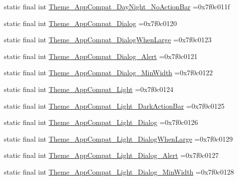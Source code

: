 \begin{DoxyCompactItemize}
\item 
static final int \mbox{\hyperlink{classbr_1_1unb_1_1cic_1_1mp_1_1marketmaster_1_1test_1_1R_1_1style_ac6993f6ab20ad18c1a265c58568cda1f}{Theme\+\_\+\+App\+Compat\+\_\+\+Day\+Night\+\_\+\+No\+Action\+Bar}} =0x7f0c011f
\item 
static final int \mbox{\hyperlink{classbr_1_1unb_1_1cic_1_1mp_1_1marketmaster_1_1test_1_1R_1_1style_a271f53b900eb4d5d0e50e66018ad697e}{Theme\+\_\+\+App\+Compat\+\_\+\+Dialog}} =0x7f0c0120
\item 
static final int \mbox{\hyperlink{classbr_1_1unb_1_1cic_1_1mp_1_1marketmaster_1_1test_1_1R_1_1style_a4bf259a83106d9bae3563b689e81ff97}{Theme\+\_\+\+App\+Compat\+\_\+\+Dialog\+When\+Large}} =0x7f0c0123
\item 
static final int \mbox{\hyperlink{classbr_1_1unb_1_1cic_1_1mp_1_1marketmaster_1_1test_1_1R_1_1style_aeb0354574072f32c3c8e49de3caa9360}{Theme\+\_\+\+App\+Compat\+\_\+\+Dialog\+\_\+\+Alert}} =0x7f0c0121
\item 
static final int \mbox{\hyperlink{classbr_1_1unb_1_1cic_1_1mp_1_1marketmaster_1_1test_1_1R_1_1style_ac4ccbd2e058d930ea2477aac390aaf52}{Theme\+\_\+\+App\+Compat\+\_\+\+Dialog\+\_\+\+Min\+Width}} =0x7f0c0122
\item 
static final int \mbox{\hyperlink{classbr_1_1unb_1_1cic_1_1mp_1_1marketmaster_1_1test_1_1R_1_1style_a74c2de29c2c0b4cfaa15db3dfe48a5ff}{Theme\+\_\+\+App\+Compat\+\_\+\+Light}} =0x7f0c0124
\item 
static final int \mbox{\hyperlink{classbr_1_1unb_1_1cic_1_1mp_1_1marketmaster_1_1test_1_1R_1_1style_a3e959fd7b5ed64ab6522fe52060aef56}{Theme\+\_\+\+App\+Compat\+\_\+\+Light\+\_\+\+Dark\+Action\+Bar}} =0x7f0c0125
\item 
static final int \mbox{\hyperlink{classbr_1_1unb_1_1cic_1_1mp_1_1marketmaster_1_1test_1_1R_1_1style_ad6d9d1ac61f3643e40bef2e16ef6a84a}{Theme\+\_\+\+App\+Compat\+\_\+\+Light\+\_\+\+Dialog}} =0x7f0c0126
\item 
static final int \mbox{\hyperlink{classbr_1_1unb_1_1cic_1_1mp_1_1marketmaster_1_1test_1_1R_1_1style_a8c94c060985e20c36fcde8b43681111b}{Theme\+\_\+\+App\+Compat\+\_\+\+Light\+\_\+\+Dialog\+When\+Large}} =0x7f0c0129
\item 
static final int \mbox{\hyperlink{classbr_1_1unb_1_1cic_1_1mp_1_1marketmaster_1_1test_1_1R_1_1style_a51764b51c67bcc348b2915c3e917ff87}{Theme\+\_\+\+App\+Compat\+\_\+\+Light\+\_\+\+Dialog\+\_\+\+Alert}} =0x7f0c0127
\item 
static final int \mbox{\hyperlink{classbr_1_1unb_1_1cic_1_1mp_1_1marketmaster_1_1test_1_1R_1_1style_a1e830885270ae40726c9ea01cf0f01d4}{Theme\+\_\+\+App\+Compat\+\_\+\+Light\+\_\+\+Dialog\+\_\+\+Min\+Width}} =0x7f0c0128

\end{DoxyCompactItemize}
